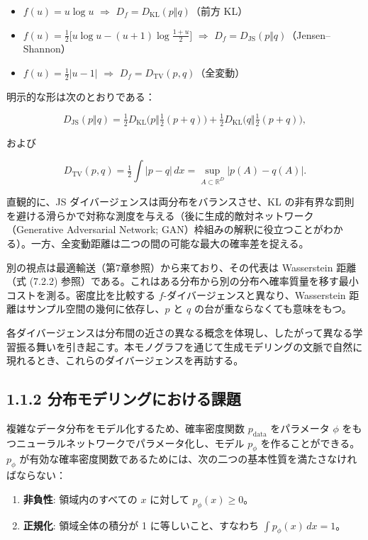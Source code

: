 \begin{itemize}
\item $f(u) = u \log u$ $\Rightarrow$ $D_f = D_{\mathrm{KL}}(p\Vert q)$（前方 KL）
\item $f(u) = \tfrac{1}{2}\bigl[u\log u - (u+1)\log\tfrac{1+u}{2}\bigr]$ $\Rightarrow$ $D_f = D_{\mathrm{JS}}(p\Vert q)$（Jensen–Shannon）
\item $f(u) = \tfrac{1}{2}|u-1|$ $\Rightarrow$ $D_f = D_{\mathrm{TV}}(p,q)$（全変動）
\end{itemize}


明示的な形は次のとおりである：

\[
D_{\mathrm{JS}}(p\Vert q)
= \tfrac{1}{2} D_{\mathrm{KL}}\bigl(p \Vert \tfrac{1}{2}(p+q)\bigr)
+ \tfrac{1}{2} D_{\mathrm{KL}}\bigl(q \Vert \tfrac{1}{2}(p+q)\bigr),
\]


および

\[
D_{\mathrm{TV}}(p,q) = \tfrac{1}{2}\int |p-q|\, dx = \sup_{A\subset\mathbb{R}^D}|p(A)-q(A)|.
\]


直観的に、JS ダイバージェンスは両分布をバランスさせ、KL の非有界な罰則を避ける滑らかで対称な測度を与える（後に生成的敵対ネットワーク（Generative Adversarial Network; GAN）枠組みの解釈に役立つことがわかる）。一方、全変動距離は二つの間の可能な最大の確率差を捉える。

別の視点は最適輸送（第7章参照）から来ており、その代表は Wasserstein 距離（式 (7.2.2) 参照）である。これはある分布から別の分布へ確率質量を移す最小コストを測る。密度比を比較する $f$-ダイバージェンスと異なり、Wasserstein 距離はサンプル空間の幾何に依存し、$p$ と $q$ の台が重ならなくても意味をもつ。

各ダイバージェンスは分布間の近さの異なる概念を体現し、したがって異なる学習振る舞いを引き起こす。本モノグラフを通じて生成モデリングの文脈で自然に現れるとき、これらのダイバージェンスを再訪する。

\subsection*{1.1.2 分布モデリングにおける課題}


複雑なデータ分布をモデル化するため、確率密度関数 $p_{\mathrm{data}}$ をパラメータ $\phi$ をもつニューラルネットワークでパラメータ化し、モデル $p_\phi$ を作ることができる。$p_\phi$ が有効な確率密度関数であるためには、次の二つの基本性質を満たさなければならない：

\begin{enumerate}
\item \textbf{非負性}: 領域内のすべての $x$ に対して $p_\phi(x) \ge 0$。
\item \textbf{正規化}: 領域全体の積分が 1 に等しいこと、すなわち $\int p_\phi(x)\, dx = 1$。
\end{enumerate}


